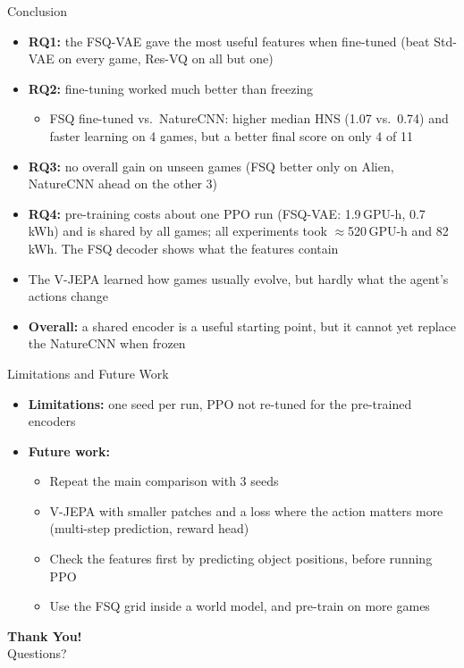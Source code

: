 \documentclass[aspectratio=43,10pt]{beamer}
\begin{document}
\begin{frame}{Conclusion}
  \begin{itemize}\small\setlength\itemsep{0.35em}
    \item \textbf{RQ1:} the FSQ-VAE gave the most useful features when fine-tuned (beat Std-VAE on every game,
          Res-VQ on all but one)
    \item \textbf{RQ2:} fine-tuning worked much better than freezing
      \begin{itemize}
        \item FSQ fine-tuned vs.\ NatureCNN: higher median HNS (1.07 vs.\ 0.74) and faster
              learning on 4 games, but a better final score on only 4 of 11
      \end{itemize}
    \item \textbf{RQ3:} no overall gain on unseen games (FSQ better only on Alien, NatureCNN
          ahead on the other 3)
    \item \textbf{RQ4:} pre-training costs about one PPO run (FSQ-VAE: 1.9\,GPU-h, 0.7\,kWh) and is
          shared by all games; all experiments took $\approx$520\,GPU-h and 82\,kWh. The FSQ
          decoder shows what the features contain
    \item The V-JEPA learned how games usually evolve, but hardly what the agent's actions change
    \item \textbf{Overall:} a shared encoder is a useful starting point, but it cannot yet
          replace the NatureCNN when frozen
  \end{itemize}
\end{frame}

\begin{frame}{Limitations and Future Work}
  \begin{itemize}\setlength\itemsep{0.55em}
    \item \textbf{Limitations:} one seed per run, PPO not re-tuned for the pre-trained encoders
    \item \textbf{Future work:}
      \begin{itemize}\setlength\itemsep{0.3em}
        \item Repeat the main comparison with 3 seeds
        \item V-JEPA with smaller patches and a loss where the action matters more
              (multi-step prediction, reward head)
        \item Check the features first by predicting object positions, before running PPO
        \item Use the FSQ grid inside a world model, and pre-train on more games
      \end{itemize}
  \end{itemize}
\end{frame}

\begin{frame}
  \vfill
  \centering
  {\Huge\bfseries Thank You!}\\[1em]
  {\Large Questions?}
  \vfill
\end{frame}
\end{document}
